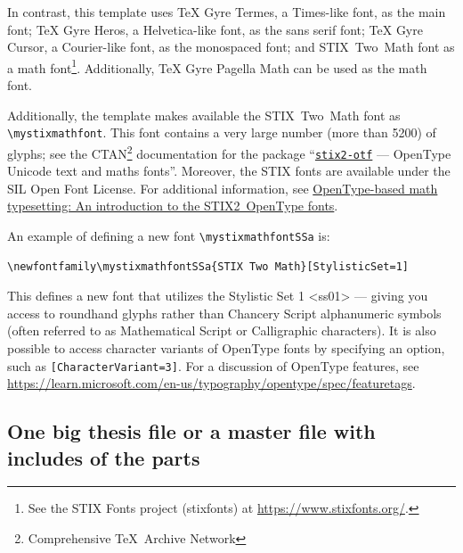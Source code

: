 \documentclass[12pt, twoside]{article}
\begin{document}
In contrast, this template uses TeX Gyre Termes, a Times-like font, as the main font; TeX Gyre Heros, a Helvetica-like font, as the sans serif font; 
TeX Gyre Cursor, a Courier-like font, as the monospaced font; and 
\gls{STIX}~Two~Math font as a math font\footnote{See the \gls{STIX} Fonts project (stixfonts) at \url{https://www.stixfonts.org/}.}. Additionally, TeX Gyre Pagella Math can be used as the math font.

Additionally, the template makes available the \gls{STIX}~Two~Math font as \texttt{\textbackslash mystixmathfont}. This font contains a very large number (more than \num{5200}) of glyphs; see the CTAN\footnote{Comprehensive \TeX\  Archive Network} documentation for the package \enquote{\href{https://ctan.org/pkg/stix2-otf/?lang=en}{\texttt{stix2-otf}} --- OpenType Unicode text and maths fonts}. Moreover, the \gls{STIX} fonts are available under the SIL Open Font License. For additional information, see \href{https://www.overleaf.com/learn/latex/Articles/OpenType-based_math_typesetting%3A_An_introduction_to_the_STIX2_OpenType_fonts}{OpenType-based math typesetting: An introduction to the STIX2~OpenType fonts}.

An example of defining a new font \texttt{\textbackslash mystixmathfontSSa} is:
\begin{lstlisting}[style=latexExampleForAuthors, escapechar=£]
% To access the Stylistic Set 1 <ss01> such as £{\mystixmathfontSSa ℋ}£
\newfontfamily\mystixmathfontSSa{STIX Two Math}[StylisticSet=1]
\end{lstlisting}
\noindent This defines a new font that utilizes the Stylistic Set 1 <ss01> --- giving you access to roundhand glyphs rather than Chancery Script alphanumeric symbols (often referred to as Mathematical Script or Calligraphic characters). It is also possible to access character variants of OpenType fonts by specifying an option, such as \texttt{[CharacterVariant=3]}. For a discussion of OpenType features, see \url{https://learn.microsoft.com/en-us/typography/opentype/spec/featuretags}.

\subsection{One big thesis file or a master file with includes of the parts}
\label{sec:cycle3onebigFIlevsincludes}
\end{document}
